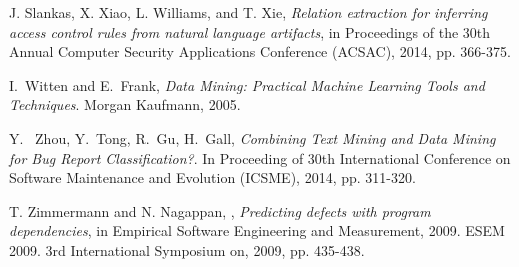 \documentclass[conference]{IEEEtran}
\begin{document}
\begin{thebibliography}{1}
J. Slankas, X. Xiao, L. Williams, and T. Xie, \emph{Relation extraction for inferring access control rules from natural language artifacts}, in Proceedings of the 30th Annual Computer Security Applications Conference (ACSAC), 2014, pp. 366-375.

I.~Witten and E.~Frank, \emph{Data Mining: Practical Machine Learning Tools and Techniques}. Morgan Kaufmann, 2005. 

Y. ~Zhou, Y.~Tong, R.~Gu, H.~Gall, \emph{Combining Text Mining and Data Mining for Bug Report Classification?}. In Proceeding of 30th International Conference on Software Maintenance and Evolution (ICSME), 2014, pp. 311-320.

T. Zimmermann and N. Nagappan, , \emph{Predicting defects with program dependencies}, in Empirical Software Engineering and Measurement, 2009. ESEM 2009. 3rd International Symposium on, 2009, pp. 435-438. 


 



\end{thebibliography}
		    
\end{document}
